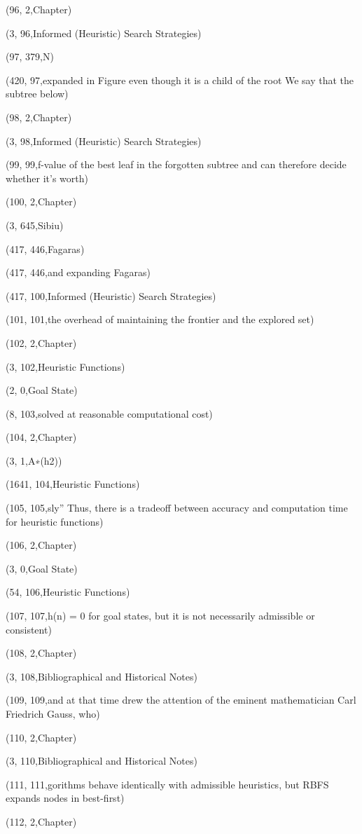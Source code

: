(96, 2,Chapter)

(3, 96,Informed (Heuristic) Search Strategies)

(97, 379,N)

(420, 97,expanded in Figure  even though it is a child of the root We say that the subtree below)

(98, 2,Chapter)

(3, 98,Informed (Heuristic) Search Strategies)

(99, 99,f-value of the best leaf in the forgotten subtree and can therefore decide whether it’s worth)

(100, 2,Chapter)

(3, 645,Sibiu)

(417, 446,Fagaras)

(417, 446,and expanding Fagaras)

(417, 100,Informed (Heuristic) Search Strategies)

(101, 101,the overhead of maintaining the frontier and the explored set)

(102, 2,Chapter)

(3, 102,Heuristic Functions)

(2, 0,Goal State)

(8, 103,solved at reasonable computational cost)

(104, 2,Chapter)

(3, 1,A∗(h2))

(1641, 104,Heuristic Functions)

(105, 105,sly” Thus, there is a tradeoff between accuracy and computation time for heuristic functions)

(106, 2,Chapter)

(3, 0,Goal State)

(54, 106,Heuristic Functions)

(107, 107,h(n) = 0 for goal states, but it is not necessarily admissible or consistent)

(108, 2,Chapter)

(3, 108,Bibliographical and Historical Notes)

(109, 109,and at that time drew the attention of the eminent mathematician Carl Friedrich Gauss, who)

(110, 2,Chapter)

(3, 110,Bibliographical and Historical Notes)

(111, 111,gorithms behave identically with admissible heuristics, but RBFS expands nodes in best-ﬁrst)

(112, 2,Chapter)

